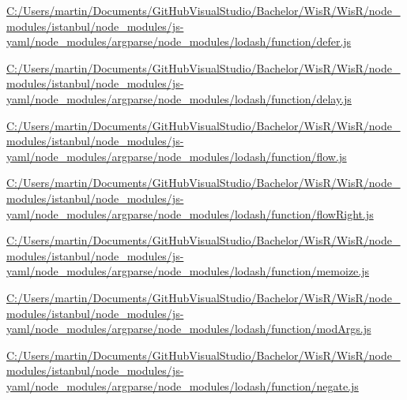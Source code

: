 \begin{DoxyCompactItemize}
\item 
\hyperlink{_c_1_2_users_2martin_2_documents_2_git_hub_visual_studio_2_bachelor_2_wis_r_2_wis_r_2node_module9e91ebb44c4243369c82e7fb9fa83046}{C\+:/\+Users/martin/\+Documents/\+Git\+Hub\+Visual\+Studio/\+Bachelor/\+Wis\+R/\+Wis\+R/node\+\_\+modules/istanbul/node\+\_\+modules/js-\/yaml/node\+\_\+modules/argparse/node\+\_\+modules/lodash/function/defer.\+js}
\item 
\hyperlink{_c_1_2_users_2martin_2_documents_2_git_hub_visual_studio_2_bachelor_2_wis_r_2_wis_r_2node_module1d068cc183bd5e56d57bee7459f375ad}{C\+:/\+Users/martin/\+Documents/\+Git\+Hub\+Visual\+Studio/\+Bachelor/\+Wis\+R/\+Wis\+R/node\+\_\+modules/istanbul/node\+\_\+modules/js-\/yaml/node\+\_\+modules/argparse/node\+\_\+modules/lodash/function/delay.\+js}
\item 
\hyperlink{_c_1_2_users_2martin_2_documents_2_git_hub_visual_studio_2_bachelor_2_wis_r_2_wis_r_2node_modulea775a0da32206c2ef513bf59c23b5306}{C\+:/\+Users/martin/\+Documents/\+Git\+Hub\+Visual\+Studio/\+Bachelor/\+Wis\+R/\+Wis\+R/node\+\_\+modules/istanbul/node\+\_\+modules/js-\/yaml/node\+\_\+modules/argparse/node\+\_\+modules/lodash/function/flow.\+js}
\item 
\hyperlink{_c_1_2_users_2martin_2_documents_2_git_hub_visual_studio_2_bachelor_2_wis_r_2_wis_r_2node_module8d9c272d8d1adcee929356faebaf8265}{C\+:/\+Users/martin/\+Documents/\+Git\+Hub\+Visual\+Studio/\+Bachelor/\+Wis\+R/\+Wis\+R/node\+\_\+modules/istanbul/node\+\_\+modules/js-\/yaml/node\+\_\+modules/argparse/node\+\_\+modules/lodash/function/flow\+Right.\+js}
\item 
\hyperlink{_c_1_2_users_2martin_2_documents_2_git_hub_visual_studio_2_bachelor_2_wis_r_2_wis_r_2node_modulead9f024545131f9c5af2746b5f76e290}{C\+:/\+Users/martin/\+Documents/\+Git\+Hub\+Visual\+Studio/\+Bachelor/\+Wis\+R/\+Wis\+R/node\+\_\+modules/istanbul/node\+\_\+modules/js-\/yaml/node\+\_\+modules/argparse/node\+\_\+modules/lodash/function/memoize.\+js}
\item 
\hyperlink{_c_1_2_users_2martin_2_documents_2_git_hub_visual_studio_2_bachelor_2_wis_r_2_wis_r_2node_module560fe32066c4e4338d291c61724bdd93}{C\+:/\+Users/martin/\+Documents/\+Git\+Hub\+Visual\+Studio/\+Bachelor/\+Wis\+R/\+Wis\+R/node\+\_\+modules/istanbul/node\+\_\+modules/js-\/yaml/node\+\_\+modules/argparse/node\+\_\+modules/lodash/function/mod\+Args.\+js}
\item 
\hyperlink{_c_1_2_users_2martin_2_documents_2_git_hub_visual_studio_2_bachelor_2_wis_r_2_wis_r_2node_module601daaf29438cdaa981ad2ec4661fb94}{C\+:/\+Users/martin/\+Documents/\+Git\+Hub\+Visual\+Studio/\+Bachelor/\+Wis\+R/\+Wis\+R/node\+\_\+modules/istanbul/node\+\_\+modules/js-\/yaml/node\+\_\+modules/argparse/node\+\_\+modules/lodash/function/negate.\+js}

\end{DoxyCompactItemize}
